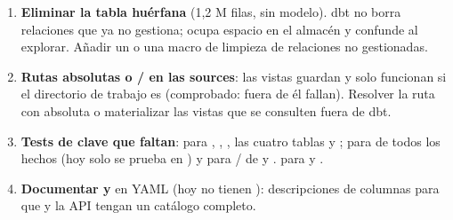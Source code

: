 \begin{enumerate}
\item \textbf{Eliminar la tabla huérfana } (1,2 M filas, sin modelo). dbt no borra relaciones que ya no gestiona; ocupa espacio en el almacén y confunde al explorar. Añadir un  o una macro de limpieza de relaciones no gestionadas.
\item \textbf{Rutas absolutas o /  en las sources}: las vistas  guardan  y solo funcionan si el directorio de trabajo es  (comprobado: fuera de él fallan). Resolver la ruta con  absoluta o materializar las vistas que se consulten fuera de dbt.
\item \textbf{Tests de clave que faltan}:  para , , , las cuatro tablas  y ;  para  de todos los hechos (hoy solo se prueba en ) y para / de  y .  para  y .
\item \textbf{Documentar  y } en YAML (hoy no tienen ): descripciones de columnas para que  y la API tengan un catálogo completo.

\end{enumerate}

